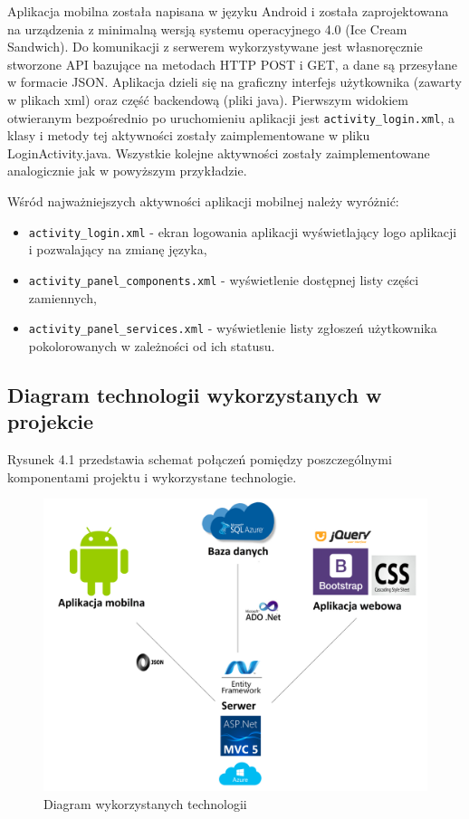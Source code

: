 \documentclass[a4paper,11pt]{article}
\begin{document}
Aplikacja mobilna została napisana w języku Android i została zaprojektowana na urządzenia z minimalną wersją systemu operacyjnego 4.0 (Ice Cream Sandwich). Do komunikacji z serwerem wykorzystywane jest własnoręcznie stworzone API bazujące na metodach HTTP POST i GET, a dane są przesyłane w formacie JSON. Aplikacja dzieli się na graficzny interfejs użytkownika (zawarty w plikach xml) oraz część backendową (pliki java). Pierwszym widokiem otwieranym bezpośrednio po uruchomieniu aplikacji jest \texttt{activity\_login.xml}, a klasy i metody tej aktywności zostały zaimplementowane w pliku LoginActivity.java. Wszystkie kolejne aktywności zostały zaimplementowane analogicznie jak w powyższym przykładzie.

Wśród najważniejszych aktywności aplikacji mobilnej należy wyróżnić:
\begin{itemize}
	\item \texttt{activity\_login.xml} - ekran logowania aplikacji  wyświetlający logo aplikacji i pozwalający na zmianę języka,
	\item \texttt{activity\_panel\_components.xml} - wyświetlenie dostępnej listy części zamiennych,
	\item \texttt{activity\_panel\_services.xml} - wyświetlenie listy zgłoszeń użytkownika pokolorowanych w zależności od ich statusu.
\end{itemize}
\subsection{Diagram technologii wykorzystanych w projekcie}
Rysunek 4.1 przedstawia schemat połączeń pomiędzy poszczególnymi komponentami projektu i wykorzystane technologie.
\begin{figure}[H]
	\centering
	\includegraphics[width=\textwidth,height=0.6\textheight]{diagramTechnologii.png}
	\caption{Diagram wykorzystanych technologii}
\end{figure}
\end{document}
